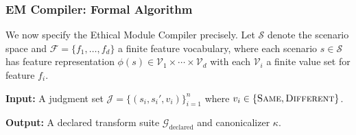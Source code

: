 \documentclass[12pt]{article}
\begin{document}
\subsubsection{EM Compiler: Formal Algorithm}

We now specify the Ethical Module Compiler precisely. Let $\mathcal{S}$ denote the scenario space and
$\mathcal{F} = \{f_1, \ldots, f_d\}$ a finite feature vocabulary, where each scenario $s \in \mathcal{S}$ has feature representation
$\phi(s) \in \mathcal{V}_1 \times \cdots \times \mathcal{V}_d$ with each $\mathcal{V}_i$ a finite value set for feature $f_i$.

\textbf{Input:} A judgment set $\mathcal{J} = \{(s_i, s_i', v_i)\}_{i=1}^{n}$ where $v_i \in \{\textsc{Same}, \textsc{Different}\}$.

\textbf{Output:} A declared transform suite $\mathcal{G}_{\text{declared}}$ and canonicalizer $\kappa$.
\end{document}
